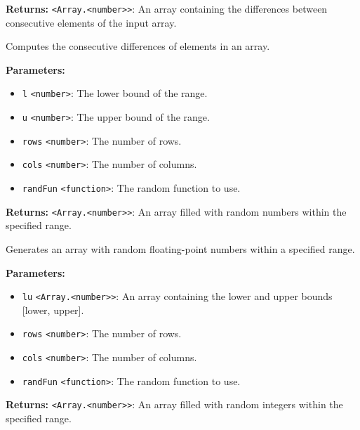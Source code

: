 \documentclass[12pt,a4paper]{article}
\begin{document}
\noindent \textbf{Returns:} \texttt{<Array.<number>>}: An array containing the differences between consecutive elements of the input array.

\noindent Computes the consecutive differences of elements in an array.

\vspace{5mm}
\noindent {}


\noindent \textbf{Parameters:}
\begin{itemize}
  \item \texttt{l} \texttt{<number>}: The lower bound of the range.
  \item \texttt{u} \texttt{<number>}: The upper bound of the range.
  \item \texttt{rows} \texttt{<number>}: The number of rows.
  \item \texttt{cols} \texttt{<number>}: The number of columns.
  \item \texttt{randFun} \texttt{<function>}: The random function to use.
\end{itemize}

\noindent \textbf{Returns:} \texttt{<Array.<number>>}: An array filled with random numbers within the specified range.

\noindent Generates an array with random floating-point numbers within a specified range.

\vspace{5mm}
\noindent {}


\noindent \textbf{Parameters:}
\begin{itemize}
  \item \texttt{lu} \texttt{<Array.<number>>}: An array containing the lower and upper bounds [lower, upper].
  \item \texttt{rows} \texttt{<number>}: The number of rows.
  \item \texttt{cols} \texttt{<number>}: The number of columns.
  \item \texttt{randFun} \texttt{<function>}: The random function to use.
\end{itemize}

\noindent \textbf{Returns:} \texttt{<Array.<number>>}: An array filled with random integers within the specified range.
\end{document}
